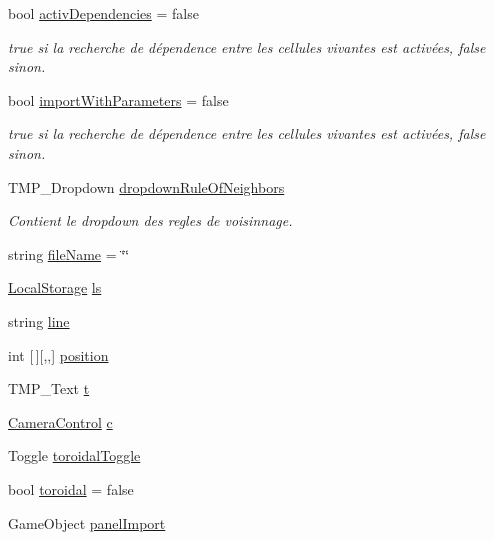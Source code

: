 \begin{DoxyCompactItemize}
bool \mbox{\hyperlink{class_parameters_a69b261ceea3746beb517d7082a8fc810}{activ\+Dependencies}} = false
\begin{DoxyCompactList}\small\item\em true si la recherche de dépendence entre les cellules vivantes est activées, false sinon. \end{DoxyCompactList}\item 
bool \mbox{\hyperlink{class_parameters_a2b7e1fe1403da019b5762792e4ea302b}{import\+With\+Parameters}} = false
\begin{DoxyCompactList}\small\item\em true si la recherche de dépendence entre les cellules vivantes est activées, false sinon. \end{DoxyCompactList}\item 
T\+M\+P\+\_\+\+Dropdown \mbox{\hyperlink{class_parameters_a9bb907abb659026dbf7b4f64343aefa1}{dropdown\+Rule\+Of\+Neighbors}}
\begin{DoxyCompactList}\small\item\em Contient le dropdown des regles de voisinnage. \end{DoxyCompactList}\item 
string \mbox{\hyperlink{class_parameters_abbfa8fa8cae3b3c7db55b2c23ec747d5}{file\+Name}} = \char`\"{}\char`\"{}
\item 
\mbox{\hyperlink{class_local_storage}{Local\+Storage}} \mbox{\hyperlink{class_parameters_ab63c98cfc7508243010978c7c4d515a5}{ls}}
\item 
string \mbox{\hyperlink{class_parameters_a978bf381c1fd3f17e4289f182b7d647b}{line}}
\item 
int \mbox{[}$\,$\mbox{]}\mbox{[},,\mbox{]} \mbox{\hyperlink{class_parameters_ad01c1db17d90b97c666abf21a9c6fcd1}{position}}
\item 
T\+M\+P\+\_\+\+Text \mbox{\hyperlink{class_parameters_ab34fbc511ef46943e88471495d3b37c0}{t}}
\item 
\mbox{\hyperlink{class_camera_control}{Camera\+Control}} \mbox{\hyperlink{class_parameters_aac3a7af7ad68f30d87e89debcb137c1f}{c}}
\item 
Toggle \mbox{\hyperlink{class_parameters_a3cf74feb1b6bd8cc24bc3ef0e78e15fb}{toroidal\+Toggle}}
\item 
bool \mbox{\hyperlink{class_parameters_a8aec5ef7f7bdb0497b9de3ddce353c88}{toroidal}} = false
\item 
Game\+Object \mbox{\hyperlink{class_parameters_a9039782e9b57b1cca98f109c8bd22928}{panel\+Import}}
\end{DoxyCompactItemize}



